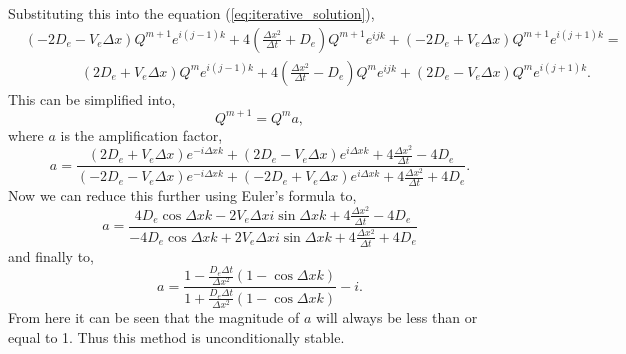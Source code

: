 \documentclass[11pt, letterpaper]{article}
\begin{document}
Substituting this into the equation (\ref{eq:iterative_solution}),
\[
    \begin{split}
        &(-2D_e - V_e\Delta x)Q^{m + 1}e^{i(j - 1)k} + 4\left(\frac{\Delta x^2}{\Delta t} + D_e\right)Q^{m + 1}e^{ijk} + (-2D_e + V_e \Delta x) Q^{m + 1}e^{i(j + 1)k} = \\
        &\qquad\qquad (2D_e + V_e\Delta x)Q^me^{i(j - 1)k} + 4\left(\frac{\Delta x^2}{\Delta t} - D_e\right)Q^me^{ijk} + (2D_e - V_e \Delta x) Q^me^{i(j + 1)k}.
    \end{split}
\]
This can be simplified into,
\[
    Q^{m + 1} = Q^m a,
\]
where $a$ is the amplification factor,
\[
    a = \frac{(2D_e + V_e\Delta x)e^{-i\Delta xk} + (2D_e - V_e\Delta x)e^{i\Delta xk} + 4\frac{\Delta x^2}{\Delta t} - 4D_e}
    {(-2D_e - V_e\Delta x)e^{-i\Delta xk} + (-2D_e + V_e\Delta x)e^{i\Delta xk} + 4\frac{\Delta x^2}{\Delta t} + 4D_e}.
\]
Now we can reduce this further using Euler's formula to,
\[
    a = \frac{4D_e\cos\Delta xk - 2V_e\Delta xi\sin \Delta x k + 4\frac{\Delta x^2}{\Delta t} - 4D_e}
    {-4D_e\cos\Delta xk + 2V_e\Delta xi\sin \Delta x k + 4\frac{\Delta x^2}{\Delta t} + 4D_e}
\]
and finally to,
\[
    a = \frac{1 - \frac{D_e\Delta t}{\Delta x^2} (1 - \cos\Delta x k)}
    {1 + \frac{D_e\Delta t}{\Delta x^2} (1 - \cos\Delta x k)} - i.
\]
From here it can be seen that the magnitude of $a$ will always be less than or equal to 1.
Thus this method is unconditionally stable.
\end{document}
